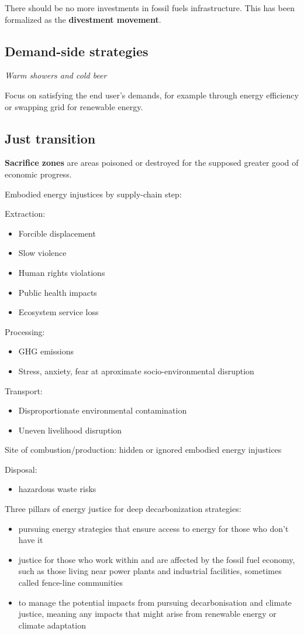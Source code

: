 There should be no more investments in fossil fuels infrastructure. This
has been formalized as the \textbf{divestment movement}.

\subsection{Demand-side strategies}

\textit{Warm showers and cold beer}

Focus on satisfying the end user's demands, for example through energy
efficiency or swapping grid for renewable energy.

\subsection{Just transition}

\textbf{Sacrifice zones} are areas poisoned or destroyed for the supposed
greater good of economic progress.

Embodied energy injustices by supply-chain step:

Extraction:
\begin{itemize}
	\item Forcible displacement
	\item Slow violence
	\item Human rights violations
	\item Public health impacts
	\item Ecosystem service loss
\end{itemize}

Processing:
\begin{itemize}
	\item GHG emissions
	\item Stress, anxiety, fear at aproximate socio-environmental
	disruption
\end{itemize}

Transport:
\begin{itemize}
	\item Disproportionate environmental contamination
	\item Uneven livelihood disruption
\end{itemize}

Site of combustion/production: hidden or ignored embodied energy injustices

Disposal:
\begin{itemize}
	\item hazardous waste risks
\end{itemize}

Three pillars of energy justice for deep decarbonization strategies:
\begin{itemize}
	\item pursuing energy strategies that ensure access to energy for those
	who don't have it
	\item justice for those who work within and are affected by the fossil
	fuel economy, such as those living near power plants and industrial
	facilities, sometimes called fence-line communities
	\item to manage the potential impacts from pursuing decarbonisation
	and climate justice, meaning any impacts that might arise from
	renewable energy or climate adaptation
\end{itemize}
